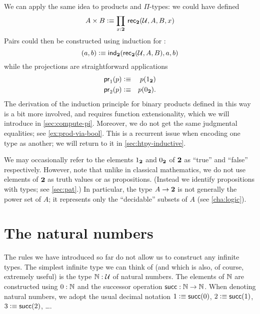 We can apply the same idea to products and $\Pi$-types: we could have defined
\[ A \times B \defeq \prd{x:\bool}\rec{\bool}(\UU,A,B,x) \]
Pairs could then be constructed using induction for \bool:
\[ (a,b) \vcentcolon\equiv \mathsf{ind}_{\mathbf{2}}(\mathsf{rec}_{\mathbf{2}}(\mathcal{U},A,B),a,b) \]
while the projections are straightforward applications
\begin{eqnarray*}
  \mathsf{pr}_{1}(p) & \vcentcolon\equiv & p({1_{\mathbf{2}}}) \\
  \mathsf{pr}_{2}(p) & \vcentcolon\equiv & p({0_{\mathbf{2}}}).
\end{eqnarray*}
The derivation of the induction principle for binary products defined in this way is a bit more involved, and requires function extensionality, which we will introduce in \autoref{sec:compute-pi}.
Moreover, we do not get the same judgmental equalities; see \autoref{ex:prod-via-bool}.
This is a recurrent issue when encoding one type as another; we will return to it in \autoref{sec:htpy-inductive}. 

We may occasionally refer to the elements ${1_{\mathbf{2}}}$ and ${0_{\mathbf{2}}}$ of $\mathbf{2}$ as ``true'' and ``false'' respectively.
However, note that unlike in classical mathematics, we do not use elements of $\mathbf{2}$ as truth values
%
or as propositions.
(Instead we identify propositions with types; see \autoref{sec:pat}.)
In particular, the type $A \to \mathbf{2}$ is not generally the power set of $A$; it represents only the ``decidable'' subsets of $A$ (see \autoref{cha:logic}).
%

%


\section{The natural numbers}
\label{sec:inductive-types}

%
%
%
The rules we have introduced so far do not allow us to construct any infinite types.
The simplest infinite type we can think of (and which is also, of course, extremely useful) is the type $\mathbb{N} : \mathcal{U}$ of natural numbers.
The elements of $\mathbb{N}$ are constructed using $0 : \mathbb{N}$ and the successor operation $\mathsf{succ} : \mathbb{N} \to \mathbb{N}$.
When denoting natural numbers, we adopt the usual decimal notation $1 \vcentcolon\equiv \mathsf{succ}(0)$, $2 \vcentcolon\equiv \mathsf{succ}(1)$, $3 \vcentcolon\equiv \mathsf{succ}(2)$, \dots.

